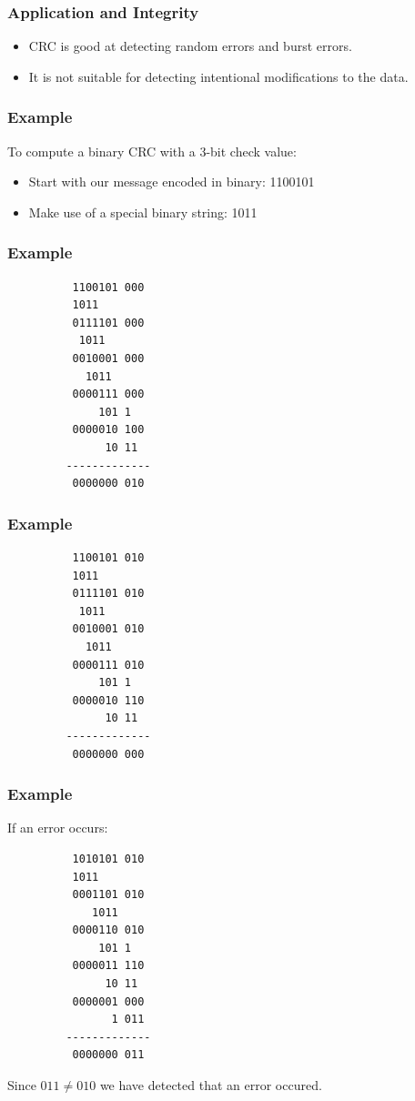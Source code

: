 \documentclass{beamer}
\begin{document}
\begin{frame}
	\frametitle{Application and Integrity}
	\begin{itemize}
		\item CRC is good at detecting random errors and burst errors.
		\item It is not suitable for detecting intentional modifications to the data.
	\end{itemize}
\end{frame}

\begin{frame}
	\frametitle{Example}
	To compute a binary CRC with a 3-bit check value:
	\begin{itemize}
		\item Start with our message encoded in binary: 1100101
		\item Make use of a special binary string: 1011
	\end{itemize}
\end{frame}

\begin{frame}[fragile]
	\frametitle{Example}
    \begin{center}
      \begin{verbatim}
          1100101 000
          1011
          0111101 000
           1011
          0010001 000
            1011
          0000111 000
              101 1
          0000010 100
               10 11
         -------------     
          0000000 010
      \end{verbatim}
    \end{center}
\end{frame}

\begin{frame}[fragile]
	\frametitle{Example}
    \begin{center}
      \begin{verbatim}
          1100101 010
          1011
          0111101 010
           1011
          0010001 010
            1011
          0000111 010
              101 1
          0000010 110
               10 11
         -------------     
          0000000 000
      \end{verbatim}
    \end{center}
\end{frame}

\begin{frame}[fragile]
	\frametitle{Example}
    If an error occurs: 
    \begin{center}
      \begin{verbatim}
          1010101 010
          1011
          0001101 010
             1011 
          0000110 010
              101 1
          0000011 110
               10 11
          0000001 000
                1 011
         -------------
          0000000 011
      \end{verbatim}
      Since $011 \neq 010$ we have detected that an error occured.
    \end{center}
\end{frame}
\end{document}

